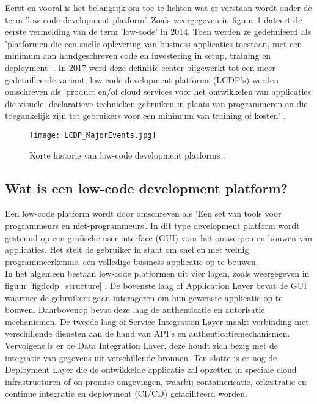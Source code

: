Eerst en vooral is het belangrijk om toe te lichten wat er verstaan wordt onder de term 'low-code development platform'. Zoals weergegeven in figuur \ref{fig:lcdp_history} dateert de eerste vermelding van de term 'low-code' in 2014. Toen werden ze gedefinieerd als 'platformen die een snelle oplevering van business applicaties toestaan, met een minimum aan handgeschreven code en investering in setup, training en deployment' \autocite{Ruscio2022}. In 2017 werd deze definitie echter bijgewerkt tot een meer gedetailleerde variant, low-code development platforms (LCDP's) werden omschreven als 'product en/of cloud services voor het ontwikkelen van applicaties die visuele, declaratieve technieken gebruiken in plaats van programmeren en die toegankelijk zijn tot gebruikers voor een minimum van training of kosten' \autocite{Ruscio2022}. \\

\begin{figure}[h]
    \centering
    \texttt{[image: LCDP\_MajorEvents.jpg]}
    \caption[Geschiedenis low-code development platforms]{Korte historie van low-code development platforms \autocite{Ruscio2022}.}
    \label{fig:lcdp_history}
\end{figure}

\subsection{Wat is een low-code development platform?}
\label{subsec:what_is_low_code}

Een low-code platform wordt door \textcite{Waszkowski2019} omschreven als 'Een set van tools voor programmeurs en niet-programmeurs'. In dit type development platform wordt gesteund op een grafische user interface (GUI) voor het ontwerpen en bouwen van applicaties. Het stelt de gebruiker in staat om snel en met weinig programmeerkennis, een volledige business applicatie op te bouwen. \\

In het algemeen bestaan low-code platformen uit vier lagen, zoals weergegeven in figuur \ref{fig:lcdp_structure} \autocite{Sahay2020}. De bovenste laag of Application Layer bevat de GUI waarmee de gebruikers gaan interageren om hun gewenste applicatie op te bouwen. Daarbovenop bevat deze laag de authenticatie en autorisatie mechanismen. De tweede laag of Service Integration Layer maakt verbinding met verschillende diensten aan de hand van API's en authenticatiemechanismen. Vervolgens is er de Data Integration Layer, deze houdt zich bezig met de integratie van gegevens uit verschillende bronnen. Ten slotte is er nog de Deployment Layer die de ontwikkelde applicatie zal opzetten in speciale cloud infrastructuren of on-premise omgevingen, waarbij containerisatie, orkestratie en continue integratie en deployment (CI/CD) gefaciliteerd worden. \\

